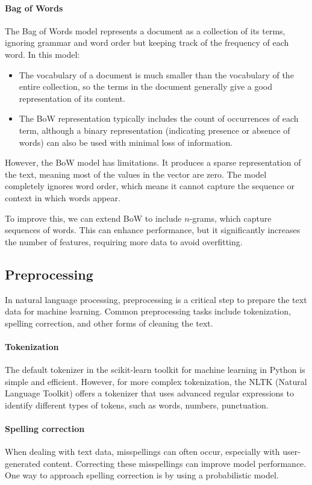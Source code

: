 \paragraph*{Bag of Words}
The Bag of Words model represents a document as a collection of its terms, ignoring grammar and word order but keeping track of the frequency of each word. 
In this model:
\begin{itemize}
    \item The vocabulary of a document is much smaller than the vocabulary of the entire collection, so the terms in the document generally give a good representation of its content.
    \item The BoW representation typically includes the count of occurrences of each term, although a binary representation (indicating presence or absence of words) can also be used with minimal loss of information.
\end{itemize}
\noindent However, the BoW model has limitations. 
It produces a sparse representation of the text, meaning most of the values in the vector are zero.
The model completely ignores word order, which means it cannot capture the sequence or context in which words appear.

To improve this, we can extend BoW to include $n$-grams, which capture sequences of words. 
This can enhance performance, but it significantly increases the number of features, requiring more data to avoid overfitting.

\subsection{Preprocessing}
In natural language processing, preprocessing is a critical step to prepare the text data for machine learning. 
Common preprocessing tasks include tokenization, spelling correction, and other forms of cleaning the text.

\paragraph*{Tokenization}
The default tokenizer in the scikit-learn toolkit for machine learning in Python is simple and efficient. 
However, for more complex tokenization, the NLTK (Natural Language Toolkit) offers a tokenizer that uses advanced regular expressions to identify different types of tokens, such as words, numbers, punctuation.

\paragraph*{Spelling correction}
When dealing with text data, misspellings can often occur, especially with user-generated content. 
Correcting these misspellings can improve model performance. One way to approach spelling correction is by using a probabilistic model.

